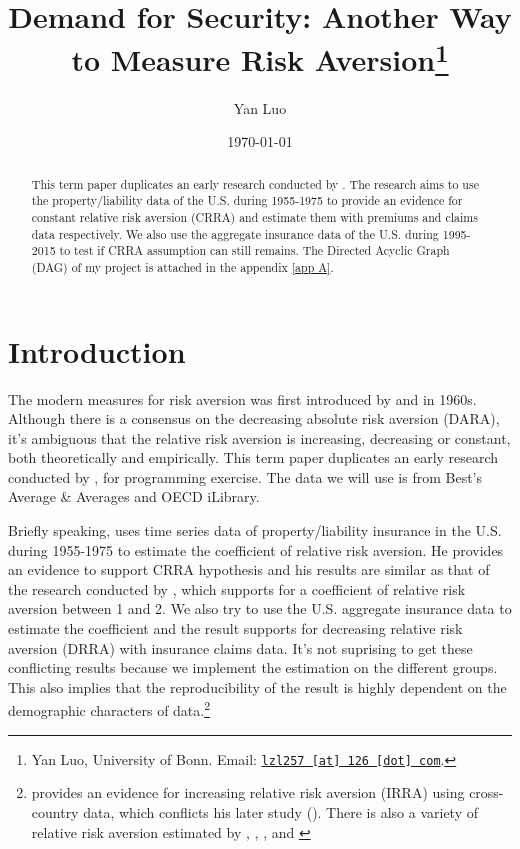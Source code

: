 \documentclass[11pt, a4paper, leqno]{article}
\begin{document}
\title{Demand for Security: Another Way to Measure Risk Aversion\thanks{Yan Luo, University of Bonn. Email: \href{mailto:lzl257@126.com}{\nolinkurl{lzl257 [at] 126 [dot] com}}.}}

\author{Yan Luo}

\date{
\today
}

\maketitle


\begin{abstract}
	This term paper duplicates an early research conducted by \citet{szpiro1986measuring}. The research aims to use the property/liability data of the U.S. during 1955-1975 to provide an evidence for constant relative risk aversion (CRRA) and estimate them with premiums and claims data respectively. We also use the aggregate insurance data of the U.S. during 1995-2015 to test if CRRA assumption can still remains. The Directed Acyclic Graph (DAG) of my project is attached in the appendix \ref{app A}.
\end{abstract}
\clearpage

\section{Introduction} %
\label{sec:introduction}

The modern measures for risk aversion was first introduced by \citet{arrow1965aspects} and \citet{pratt1978risk} in 1960s. Although there is a consensus on the decreasing absolute risk aversion (DARA), it's ambiguous that the relative risk aversion is increasing, decreasing or constant, both theoretically and empirically. This term paper duplicates an early research conducted by \citet{szpiro1986measuring}, for programming exercise. The data we will use is from Best's Average \& Averages and OECD iLibrary.

Briefly speaking, \citet{szpiro1986measuring} uses time series data of property/liability insurance in the U.S. during 1955-1975 to estimate the coefficient of relative risk aversion. He provides an evidence to support CRRA hypothesis and his results are similar as that of the research conducted by \citet{friend1975demand}, which supports for a coefficient of relative risk aversion between 1 and 2. We also try to use the U.S. aggregate insurance data to estimate the coefficient and the result supports for decreasing relative risk aversion (DRRA) with insurance claims data. It's not suprising to get these conflicting results because we implement the estimation on the different groups. This also implies that the reproducibility of the result is highly dependent on the demographic characters of data.\footnote{\citet{szpiro1983hypotheses} provides an evidence for increasing relative risk aversion (IRRA) using cross-country data, which conflicts his later study (\citet{szpiro1986measuring}). There is also a variety of relative risk aversion estimated by \citet{cohn1975individual}, \citet{siegel1982relative}, \citet{hansen1982generalized}, \citet{morin1983risk} and \citet{eisenhauer1999prudence}}
\end{document}

